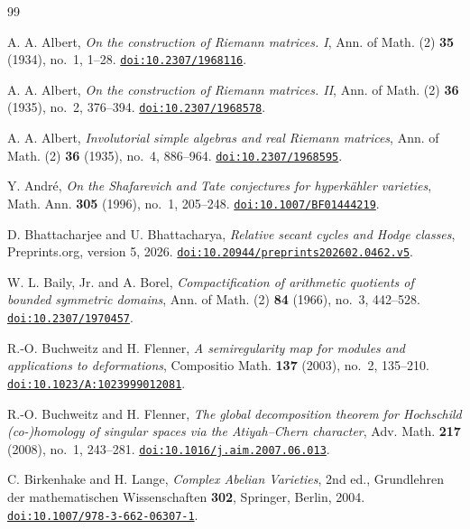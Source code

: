 \documentclass[11pt,reqno]{amsart}
\theoremstyle{plain}
\theoremstyle{definition}
\theoremstyle{remark}
\begin{document}
\begin{thebibliography}{99}

A. A. Albert,
\emph{On the construction of Riemann matrices. I},
Ann. of Math. (2) \textbf{35} (1934), no.~1, 1--28.
\href{https://doi.org/10.2307/1968116}{\texttt{doi:10.2307/1968116}}.

A. A. Albert,
\emph{On the construction of Riemann matrices. II},
Ann. of Math. (2) \textbf{36} (1935), no.~2, 376--394.
\href{https://doi.org/10.2307/1968578}{\texttt{doi:10.2307/1968578}}.

A. A. Albert,
\emph{Involutorial simple algebras and real Riemann matrices},
Ann. of Math. (2) \textbf{36} (1935), no.~4, 886--964.
\href{https://doi.org/10.2307/1968595}{\texttt{doi:10.2307/1968595}}.

Y. Andr\'e,
\emph{On the Shafarevich and Tate conjectures for hyperk\"ahler varieties},
Math. Ann. \textbf{305} (1996), no.~1, 205--248.
\href{https://doi.org/10.1007/BF01444219}{\texttt{doi:10.1007/BF01444219}}.

D. Bhattacharjee and U. Bhattacharya,
\emph{Relative secant cycles and Hodge classes},
Preprints.org, version 5, 2026.
\href{https://doi.org/10.20944/preprints202602.0462.v5}{\texttt{doi:10.20944/preprints202602.0462.v5}}.

W. L. Baily, Jr. and A. Borel,
\emph{Compactification of arithmetic quotients of bounded symmetric domains},
Ann. of Math. (2) \textbf{84} (1966), no.~3, 442--528.
\href{https://doi.org/10.2307/1970457}{\texttt{doi:10.2307/1970457}}.

R.-O. Buchweitz and H. Flenner,
\emph{A semiregularity map for modules and applications to deformations},
Compositio Math. \textbf{137} (2003), no.~2, 135--210.
\href{https://doi.org/10.1023/A:1023999012081}{\texttt{doi:10.1023/A:1023999012081}}.

R.-O. Buchweitz and H. Flenner,
\emph{The global decomposition theorem for Hochschild (co-)homology of
singular spaces via the Atiyah--Chern character},
Adv. Math. \textbf{217} (2008), no.~1, 243--281.
\href{https://doi.org/10.1016/j.aim.2007.06.013}{\texttt{doi:10.1016/j.aim.2007.06.013}}.

C. Birkenhake and H. Lange,
\emph{Complex Abelian Varieties}, 2nd ed.,
Grundlehren der mathematischen Wissenschaften \textbf{302},
Springer, Berlin, 2004.
\href{https://doi.org/10.1007/978-3-662-06307-1}{\texttt{doi:10.1007/978-3-662-06307-1}}.


\end{thebibliography}
\end{document}
